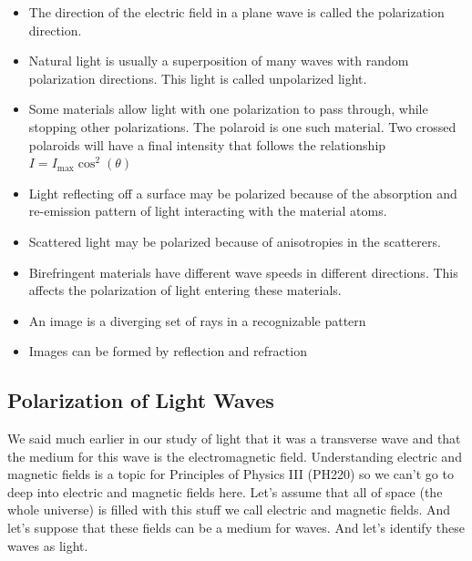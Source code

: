 \documentclass{article}
\begin{document}
\begin{itemize}
\item The direction of the electric field in a plane wave is called the
polarization direction.

\item Natural light is usually a superposition of many waves with random
polarization directions. This light is called unpolarized light.

\item Some materials allow light with one polarization to pass through,
while stopping other polarizations. The polaroid is one such material. Two
crossed polaroids will have a final intensity that follows the relationship $%
I=I_{\max }\cos ^{2}\left( \theta \right) $

\item Light reflecting off a surface may be polarized because of the
absorption and re-emission pattern of light interacting with the material
atoms.

\item Scattered light may be polarized because of anisotropies in the
scatterers.

\item Birefringent materials have different wave speeds in different
directions. This affects the polarization of light entering these materials.

\item An image is a diverging set of rays in a recognizable pattern

\item Images can be formed by reflection and refraction
\end{itemize}

\subsection{Polarization of Light Waves}

We said much earlier in our study of light that it was a transverse wave and
that the medium for this wave is the electromagnetic field. Understanding
electric and magnetic fields is a topic for Principles of Physics III
(PH220) so we can't go to deep into electric and magnetic fields here. Let's
assume that all of space (the whole universe) is filled with this stuff we
call electric and magnetic fields. And let's suppose that these fields can
be a medium for waves. And let's identify these waves as light.
\end{document}
